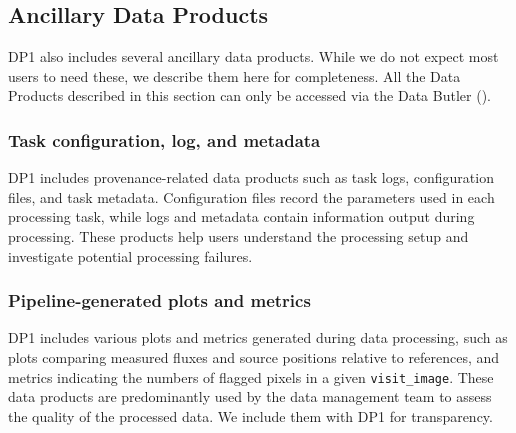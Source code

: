 



\subsection{Ancillary Data Products
\label{subsec:ancilliary}}
DP1 also includes several ancillary data products. While we do not expect most users to need these, we describe them here for completeness. All the Data Products described in this section can only be accessed via the Data Butler ().

\subsubsection{Task configuration, log, and metadata}
\gls{DP1} includes provenance-related data products such as task logs, configuration files, and task metadata.
Configuration files record the parameters used in each processing task, while logs and \gls{metadata} contain information output during processing. These products help users understand the processing setup and investigate potential processing failures.

\subsubsection{Pipeline-generated plots and metrics}
\gls{DP1} includes various plots and metrics generated during data processing, such as  plots comparing measured fluxes and source positions relative to references, and metrics indicating the numbers of flagged pixels in a given \texttt{visit\_image}. These data products are predominantly used by the data management team to assess the quality of the processed data. We include them with \gls{DP1} for transparency.

